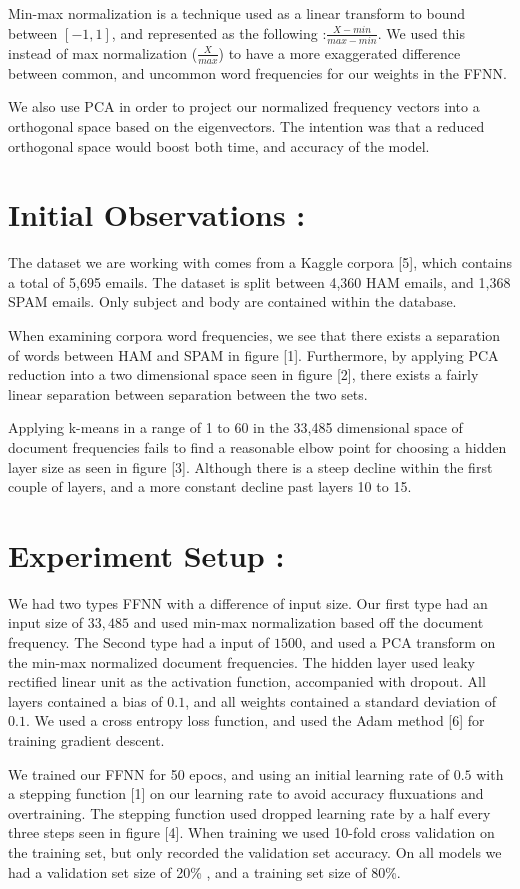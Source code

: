 \documentclass[a4paper,11pt]{article}
\begin{document}
Min-max normalization is a technique used as a linear transform to bound between $[-1,1]$, and represented as the following :$ \frac{X-min}{max-min}$. We used this instead of max normalization ($\frac{X}{max}$) to have a more exaggerated difference between common, and uncommon word frequencies for our weights in the FFNN. 

We also use PCA in order to project our normalized frequency vectors into a orthogonal space based on the eigenvectors. The intention was that a reduced orthogonal space would boost both time, and accuracy of the model. 
\section*{Initial Observations :}
The dataset we are working with comes from a Kaggle corpora [5], which contains a total of 5,695 emails. The dataset is split between 4,360 HAM emails, and 1,368 SPAM emails. Only subject and body are contained within the database. 

When examining corpora word frequencies, we see that there exists a separation of words between HAM and SPAM in figure [1].  Furthermore, by applying PCA reduction into a two dimensional space seen in figure [2], there exists a fairly linear separation between separation between the two sets. 

Applying k-means in a range of 1 to 60 in the 33,485 dimensional space of document frequencies fails to find a reasonable elbow point for choosing a hidden layer size as seen in figure [3]. Although there is a steep decline within the first couple of layers, and a more constant decline past layers 10 to 15.
\section*{Experiment Setup :}
We had two types FFNN with a difference of input size. Our first type had an input size of $33,485$ and used min-max normalization based off the document frequency. The Second type had a input of $1500$, and used a PCA transform on the min-max normalized document frequencies. The hidden layer used leaky rectified linear unit as the activation function, accompanied with dropout. All layers contained a bias of $0.1$, and all weights contained a standard deviation of $0.1$. We used a cross entropy loss function, and used the Adam method [6] for training gradient descent.

We trained our FFNN for 50 epocs, and using an initial learning rate of $0.5$ with a stepping function [1] on our learning rate to avoid accuracy fluxuations and overtraining. The stepping function used dropped learning rate by a half every three steps seen in figure [4].
When training we used 10-fold cross validation on the training set, but only recorded the validation set accuracy. On all models we had a validation set size of 20\% , and a training set size of 80\%. 
\end{document}
